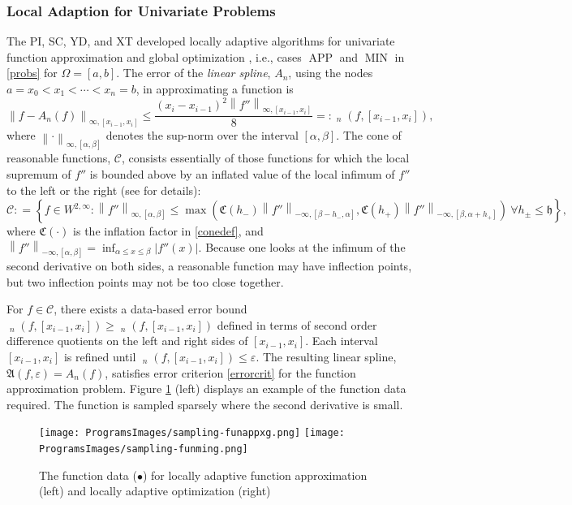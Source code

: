 \documentclass[11pt]{NSFamsart}
\newcommand{\hcut}{\mathfrak{h}}
\DeclareMathOperator{\err}{err}
\DeclareMathOperator{\oerr}{\overline{\err}}
\DeclareMathOperator{\herr}{\widehat{\err}}
\DeclareMathOperator{\APP}{APP}
\DeclareMathOperator{\OPT}{MIN}
\newcommand{\cc}{\mathcal{C}}
\newcommand{\fA}{\mathfrak{A}}
\newcommand{\fC}{\mathfrak{C}}
\def\abs#1{\ensuremath{\left \lvert #1 \right \rvert}}
\newcommand{\norm}[2][{}]{\ensuremath{\left \lVert #2 \right \rVert}_{#1}}
\begin{document}
\subsubsection{Local Adaption for Univariate Problems} \label{localadpatsec}
The PI, SC, YD, and XT developed 
locally adaptive 
algorithms for univariate function 
approximation and 
global optimization \cite{ChoEtal17a,Din15a}, i.e., cases $\APP$ and $\OPT$ in 
\eqref{probs} for $\Omega = [a,b]$.  
The error of the \emph{linear spline}, $A_n$, using the 
nodes $a = x_0 < x_1 < \cdots < x_n = b$,  in approximating a function is 
\begin{equation} \label{linsplineerror}
\norm[{\infty,[x_{i-1},x_i]}]{f - 
	A_n(f)} \le \frac{(x_i-x_{i-1})^2\norm[\infty,{[x_{i-1},x_i]}]{f''}}{8} =: \oerr_n(f,[x_{i-1},x_i]),
\end{equation}
where $\norm[{\infty,[\alpha,\beta]}]{\cdot}$ denotes the sup-norm over the interval 
$[\alpha,\beta]$.  The cone of reasonable functions, $\cc$, consists essentially of those 
functions for 
which the local supremum of $f''$ is bounded above by an inflated value of the local infimum 
of $f''$ to the left or the right (see \cite{ChoEtal17a} for details):
\[
\cc: = \left \{ f \in W^{2,\infty} : \norm[{\infty,[\alpha,\beta]}]{f''} \le \max\left(\fC(h_{-}) 
\norm[-\infty,{[\beta-h_-,\alpha]}]{f''},\fC(h_{+})
\norm[-\infty,{[\beta, \alpha+h_+]}]{f''}\right) \  \forall h_{\pm} \le \hcut \right\},
\]
where $\fC(\cdot)$ is the inflation factor in \eqref{conedef}, and $\norm[-\infty,{[\alpha, 
\beta]}]{f''} = \inf_{\alpha \le x \le \beta} \abs{f''(x)}$.  Because one looks at the infimum of the 
second derivative on both sides, 
a reasonable function may have inflection points, but two inflection points may not be too 
close together.  

For $f \in \cc$, there exists a data-based error bound 
$\herr_n(f,[x_{i-1},x_i]) \ge \oerr_n(f,[x_{i-1},x_i])$ defined in terms of second order 
difference 
quotients on the 
left and right sides of $[x_{i-1},x_i]$.  Each interval $[x_{i-1},x_i]$ is refined until  
$\herr_n(f,[x_{i-1},x_i]) \le \varepsilon$.  The resulting linear spline, $\fA(f,\varepsilon)  = A_n(f)$, 
satisfies 
error 
criterion \eqref{errorcrit} for the function approximation problem. Figure 
\ref{localadaptfig} (left) displays an example of the function data required.  The function is 
sampled sparsely where the second derivative is small.

\begin{figure}[h]
	\centering
	\vspace{-1ex}
	\texttt{[image: ProgramsImages/sampling-funappxg.png]}
	\texttt{[image: ProgramsImages/sampling-funming.png]}
	
	\vspace{-2ex}
	\caption{The function data ({\color{MATLABOrange}$\bullet$}) for  locally adaptive 
	function approximation  (left) and locally adaptive optimization (right) \label{localadaptfig}}
\end{figure}
\end{document}
